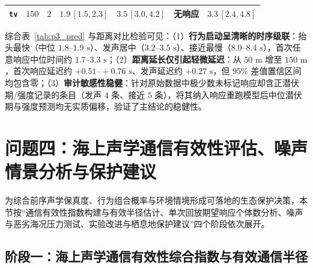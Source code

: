 \documentclass{apmcmthesis}
\begin{document}
\begin{table}[htbp]
\begin{tabular*}{\linewidth}{@{\extracolsep{\fill}}lcccccc@{}}
\texttt{tv} & $150$ & $2$ & $1.9\,[1.5, 2.3]$ & $3.5\,[3.0, 4.2]$ & 无响应 & $3.3\,[2.4, 4.8]$ \\
\bottomrule
\end{tabular*}
\par{}
\end{table}

综合表~\ref{tab:p3_pred} 与距离对比检验可见：（1）\textbf{行为启动呈清晰的时序级联}：抬头最快（中位 $1.8\text{--}1.9\text{ s}$）、发声居中（$3.2\text{--}3.5\text{ s}$）、接近最慢（$8.0\text{--}8.4\text{ s}$），首次任意响应中位时间约 $1.7\text{--}3.3\text{ s}$；（2）\textbf{距离延长仅引起轻微延迟}：从 $50\text{ m}$ 增至 $150\text{ m}$，首次响应延迟约 $+0.51\text{--}+0.76\text{ s}$、发声延迟约 $+0.27\text{ s}$，但 $95\%$ 差值置信区间均包含零；（3）\textbf{审计敏感性稳健}：针对原始数据中极少数未标记响应却含正潜伏期/强度记录的条目（发声 $4$ 条、接近 $5$ 条），将其纳入响应重跑模型后中位潜伏期与强度预测均无实质偏移，验证了主结论的稳健性。
\clearpage

\section{问题四：海上声学通信有效性评估、噪声情景分析与保护建议}

为综合前序声学保真度、行为组合概率与环境情境形成可落地的生态保护决策，本节按``通信有效性指数构建与有效半径估计、单次回放期望响应个体数分析、噪声与恶劣海况压力测试、实验改进与栖息地保护建议''四个阶段依次展开。

\subsection{阶段一：海上声学通信有效性综合指数与有效通信半径}
\end{document}
